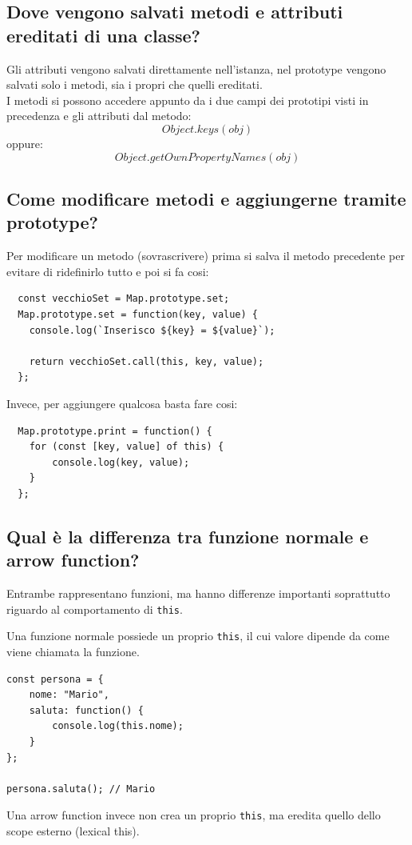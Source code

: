 \documentclass[12pt]{article}
\begin{document}
\subsection{Dove vengono salvati metodi e attributi ereditati di una classe?}
Gli attributi vengono salvati direttamente nell'istanza, nel prototype vengono salvati solo i metodi, sia i propri che quelli ereditati.\\
I metodi si possono accedere appunto da i due campi dei prototipi visti in precedenza e gli attributi dal metodo:
\[
Object.keys(obj)
\]
oppure:
\[
Object.getOwnPropertyNames(obj)
\]
\subsection{Come modificare metodi e aggiungerne tramite prototype?}
Per modificare un metodo (sovrascrivere) prima si salva il metodo precedente per evitare di ridefinirlo tutto e poi si fa cosi:
\begin{lstlisting}
  const vecchioSet = Map.prototype.set;
  Map.prototype.set = function(key, value) {
    console.log(`Inserisco ${key} = ${value}`);

    return vecchioSet.call(this, key, value);
  };
\end{lstlisting}
Invece, per aggiungere qualcosa basta fare cosi:
\begin{lstlisting}
  Map.prototype.print = function() {
    for (const [key, value] of this) {
        console.log(key, value);
    }
  };
\end{lstlisting}

\subsection{Qual è la differenza tra funzione normale e arrow function?}

Entrambe rappresentano funzioni, ma hanno differenze importanti soprattutto riguardo al comportamento di \texttt{this}.

Una funzione normale possiede un proprio \texttt{this}, il cui valore dipende da come viene chiamata la funzione.

\begin{verbatim}
const persona = {
    nome: "Mario",
    saluta: function() {
        console.log(this.nome);
    }
};

persona.saluta(); // Mario
\end{verbatim}

Una arrow function invece non crea un proprio \texttt{this}, ma eredita quello dello scope esterno (lexical this).
\end{document}
